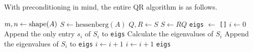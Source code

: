 With preconditioning in mind, the entire QR algorithm is as follows.

\begin{algorithm}[H] %
\begin{algorithmic}[1]
    \State $m, n \gets \mathrm{shape}(A)$
    \State $S \gets \text{hessenberg}(A)$ \label{step:qr-alg-hessenberg}
     \label{step:qr-alg-niters}
        \State $Q, R \gets S$ \label{step:qr-alg-qr-S}
        \State $S \gets RQ$
    \EndFor
    \State \texttt{eigs} $\gets$ \texttt{[]}
    \State $i \gets 0$
         \label{step:qr-alg-S_i-1x1-or-2x2}
            \State Append the only entry $s_i$ of $S_i$ to \texttt{eigs}
            \State Calculate the eigenvalues of $S_i$
                \label{step:qr-alg-S_i-eigs}
            \State Append the eigenvalues of $S_i$ to \texttt{eigs}
            \State $i \gets i + 1$
        \EndIf
        \State $i \gets i + 1$
    \EndWhile
    \State {} \texttt{eigs}
\EndProcedure
\end{algorithmic}
\caption{}
\label{Alg:qr-algorithm}
\end{algorithm}

